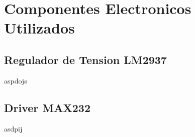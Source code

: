 \section{Componentes Electronicos Utilizados} %
\label{sec:componentes_electronicos_utilizados}







\subsection{Regulador de Tension LM2937} %
\label{sub:regulador_de_tension_lm2937}

aspdojs


\subsection{Driver MAX232} %
\label{sub:driver_max232}

asdpij






\clearpage

